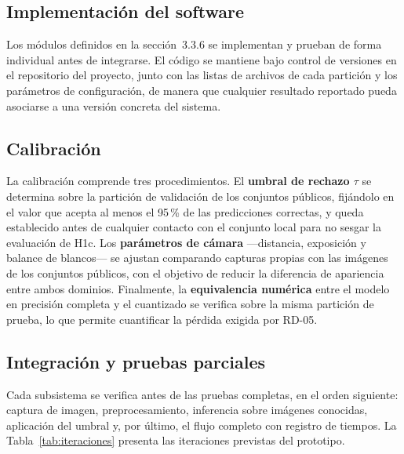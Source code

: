 \subsection{Implementación del software}

Los módulos definidos en la sección~3.3.6 se implementan y prueban de forma
individual antes de integrarse. El código se mantiene bajo control de
versiones en el repositorio del proyecto, junto con las listas de archivos de
cada partición y los parámetros de configuración, de manera que cualquier
resultado reportado pueda asociarse a una versión concreta del sistema.

\subsection{Calibración}

La calibración comprende tres procedimientos. El \textbf{umbral de rechazo
$\tau$} se determina sobre la partición de validación de los conjuntos
públicos, fijándolo en el valor que acepta al menos el 95\,\% de las
predicciones correctas, y queda establecido antes de cualquier contacto con
el conjunto local para no sesgar la evaluación de H1c. Los \textbf{parámetros
de cámara} —distancia, exposición y balance de blancos— se ajustan
comparando capturas propias con las imágenes de los conjuntos públicos, con
el objetivo de reducir la diferencia de apariencia entre ambos dominios.
Finalmente, la \textbf{equivalencia numérica} entre el modelo en precisión
completa y el cuantizado se verifica sobre la misma partición de prueba, lo
que permite cuantificar la pérdida exigida por RD-05.


\subsection{Integración y pruebas parciales}

Cada subsistema se verifica antes de las pruebas completas, en el orden
siguiente: captura de imagen, preprocesamiento, inferencia sobre imágenes
conocidas, aplicación del umbral y, por último, el flujo completo con
registro de tiempos. La Tabla~\ref{tab:iteraciones} presenta las iteraciones
previstas del prototipo.

